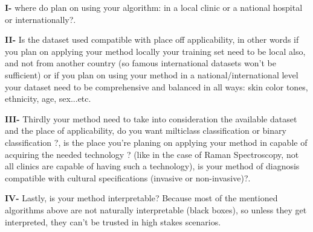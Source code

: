     \textbf{I-} where do plan on using your algorithm: in a local clinic or a national hospital or internationally?.
    
    \textbf{II-} Is the dataset used compatible with place off applicability, in other words if you plan on applying your method locally your training set need to be local also, and not from another country (so famous international datasets won't be sufficient) or if you plan on using your method in a national/international level your dataset need to be comprehensive and balanced in all ways: skin color tones, ethnicity, age, sex...etc.
    
    \textbf{III-} Thirdly your method need to take into consideration the available dataset and the place of applicability, do you want milticlass classification or binary classification ?, is the place you're planing on applying your method in capable of acquiring the needed technology ? (like in the case of Raman Spectroscopy, not all clinics are capable of having such a technology), is your method of diagnosis compatible with cultural specifications (invasive or non-invasive)?.

    \textbf{IV-} Lastly, is your method interpretable? Because most of the mentioned algorithms above are not naturally interpretable (black boxes), so unless they get interpreted, they can't be trusted in high stakes scenarios.


